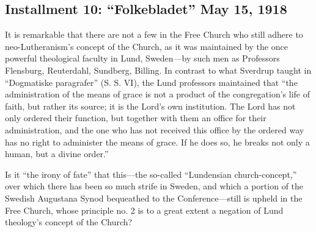 


\subsection{Installment 10: “Folkebladet” May 15, 1918}

It is remarkable that there are not a few in the Free Church who still adhere to neo-Lutheranism’s concept of the Church, as it was maintained by the once powerful theological faculty in Lund, Sweden—by such men as Professors Flensburg, Reuterdahl, Sundberg, Billing. In contrast to what Sverdrup taught in “Dogmatiske paragrafer” (S. S. VI), the Lund professors maintained that “the administration of the means of grace is not a product of the congregation’s life of faith, but rather its source; it is the Lord’s own institution. The Lord has not only ordered their function, but together with them an office for their administration, and the one who has not received this office by the ordered way has no right to administer the means of grace. If he does so, he breaks not only a human, but a divine order.”

Is it “the irony of fate” that this—the so-called “Lundensian church-concept,” over which there has been so much strife in Sweden, and which a portion of the Swedish Augustana Synod bequeathed to the Conference—still is upheld in the Free Church, whose principle no. 2 is to a great extent a negation of Lund theology’s concept of the Church?

